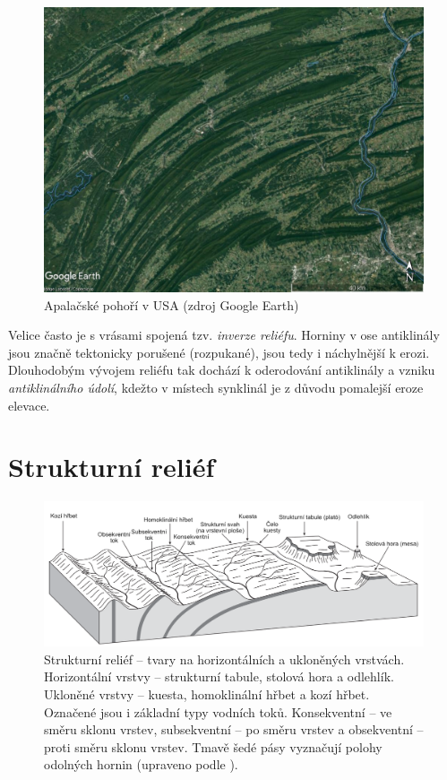 \begin{figure}[h]
	\centering
	\includegraphics[width=1\linewidth]{obrazky/tectonic/apalachian}
	\caption{Apalačské pohoří v USA (zdroj Google Earth)}
	\label{fig:apalachian}
\end{figure}

Velice často je s vrásami spojená tzv. \emph{inverze reliéfu}. Horniny v ose antiklinály jsou značně tektonicky porušené (rozpukané), jsou tedy i náchylnější k erozi. Dlouhodobým vývojem reliéfu tak dochází k oderodování antiklinály a vzniku \emph{antiklinálního údolí}, kdežto v místech synklinál je z důvodu pomalejší eroze elevace.

\section{Strukturní reliéf}

\begin{figure}[h]
	\centering
	\includegraphics[width=1\linewidth]{obrazky/tectonic/strukturni_tvary}
	\caption{Strukturní reliéf -- tvary na horizontálních a ukloněných vrstvách. Horizontální vrstvy -- strukturní tabule, stolová hora a odlehlík. Ukloněné vrstvy -- kuesta, homoklinální hřbet a kozí hřbet. Označené jsou i základní typy vodních toků. Konsekventní -- ve směru sklonu vrstev, subsekventní -- po směru vrstev a obsekventní -- proti směru sklonu vrstev. Tmavě šedé pásy vyznačují polohy odolných hornin (upraveno podle \textcite{huggettFundamentalsGeomorphology2007}).}
	\label{fig:strukturnitvary}
\end{figure}


